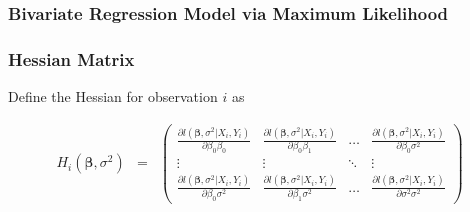 \documentclass{beamer}
\begin{document}
\begin{frame}
\frametitle{Bivariate Regression Model via Maximum Likelihood}






\end{frame}


\begin{frame}
\frametitle{Hessian Matrix}

Define the Hessian for observation $i$ as 

\begin{eqnarray}
H_{i}(\boldsymbol{\beta}, \sigma^2) & = & \begin{pmatrix} 
\frac{\partial l(\boldsymbol{\beta}, \sigma^2|X_{i}, Y_{i})}{\partial \beta_{0}\beta_{0}} 
& \frac{\partial l(\boldsymbol{\beta}, \sigma^2|X_{i}, Y_{i})}{\partial \beta_{0}\beta_{1}} & \hdots & \frac{\partial l(\boldsymbol{\beta}, \sigma^2|X_{i}, Y_{i})}{\partial \beta_{0}\sigma^2} \\
\vdots & \vdots & \ddots & \vdots \\
\frac{\partial l(\boldsymbol{\beta}, \sigma^2|X_{i}, Y_{i})}{\partial \beta_{0}\sigma^2} & \frac{\partial l(\boldsymbol{\beta}, \sigma^2|X_{i}, Y_{i})}{\partial \beta_{1}\sigma^2} & \hdots & \frac{\partial l(\boldsymbol{\beta}, \sigma^2|X_{i}, Y_{i})}{\partial \sigma^2\sigma^2} 
\end{pmatrix} \nonumber 
\end{eqnarray}




\end{frame}
\end{document}
